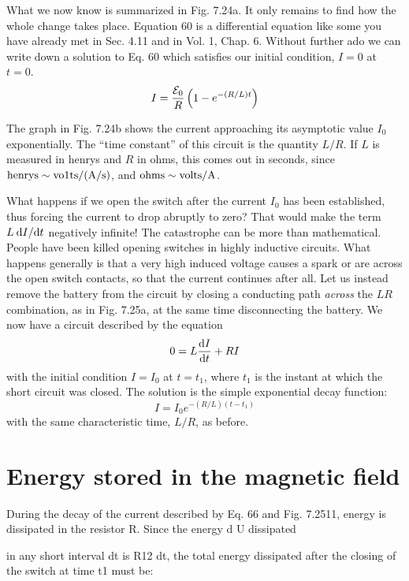 What we now know is summarized in Fig. 7.24a. It only remains
to find how the whole change takes place. Equation 60 is a differential 
equation like some you have already met in Sec. 4.11 and in
Vol. 1, Chap. 6. Without further ado we can write down a solution
to Eq. 60 which satisfies our initial condition, $I = 0$ at $t = 0$.
\begin{equation}
  I = \frac{\mathcal{E}_0}{R}\left(1-e^{-(R/L)t}\right)
\end{equation}

The graph in Fig. 7.24b shows the current approaching its asymptotic
value $I_0$ exponentially. The ``time constant'' of this circuit is
the quantity $L/R$. If $L$ is measured in henrys and $R$ in ohms, this
comes out in seconds, since $\textup{henrys} \sim \textup{vo1ts}/ (\textup{A}/\textup{s})$, and
$\textup{ohms} \sim \textup{volts}/\textup{A}$.

What happens if we open the switch after the current $I_0$ has been
established, thus forcing the current to drop abruptly to zero? That
would make the term $L\: \textup{d} I/\textup{d} t$ negatively infinite! The catastrophe
can be more than mathematical. People have been killed opening
switches in highly inductive circuits. What happens generally is that
a very high induced voltage causes a spark or are across the open
switch contacts, so that the current continues after all. Let us instead
remove the battery from the circuit by closing a conducting
path \emph{across} the $LR$ combination, as in Fig. 7.25a, at the same time 
disconnecting the battery. We now have a circuit described by the
equation
\begin{equation}
  0 = L \frac{\textup{d} I}{\textup{d} t} +RI
\end{equation}
with the initial condition $I = I_0$ at $t = t_1$, where $t_1$ is the instant at
which the short circuit was closed. The solution is the simple exponential
decay function:
\begin{equation}
  I = I_0 e^{-(R/L)(t-t_1)}
\end{equation}
with the same characteristic time, $L/R$, as before.

\iffalse

\section{Energy stored in the magnetic field}
During the decay of the current described by Eq. 66 and Fig. 7.2511,
energy is dissipated in the resistor R. Since the energy d U dissipated

in any short interval dt is R12 dt, the total energy dissipated after
the closing of the switch at time t1 must be:

